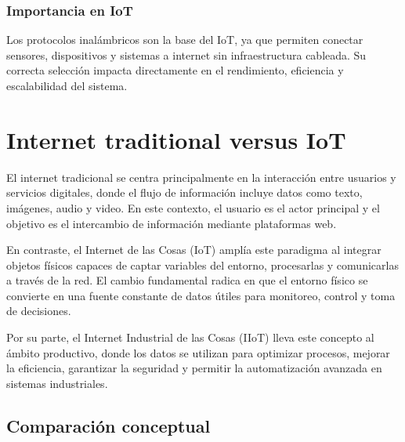 \documentclass[conference]{IEEEtran}
\begin{document}
\subsubsection{Importancia en IoT}

Los protocolos inalámbricos son la base del IoT, ya que permiten conectar sensores, dispositivos y sistemas a internet sin infraestructura cableada. Su correcta selección impacta directamente en el rendimiento, eficiencia y escalabilidad del sistema.

\section{Internet traditional versus IoT}
El internet tradicional se centra principalmente en la interacción entre usuarios y servicios digitales, donde el flujo de información incluye datos como texto, imágenes, audio y video. En este contexto, el usuario es el actor principal y el objetivo es el intercambio de información mediante plataformas web.

En contraste, el Internet de las Cosas (IoT) amplía este paradigma al integrar objetos físicos capaces de captar variables del entorno, procesarlas y comunicarlas a través de la red. El cambio fundamental radica en que el entorno físico se convierte en una fuente constante de datos útiles para monitoreo, control y toma de decisiones.

Por su parte, el Internet Industrial de las Cosas (IIoT) lleva este concepto al ámbito productivo, donde los datos se utilizan para optimizar procesos, mejorar la eficiencia, garantizar la seguridad y permitir la automatización avanzada en sistemas industriales.

\subsection{Comparación conceptual}

\begin{center}
\end{center}
\end{document}
